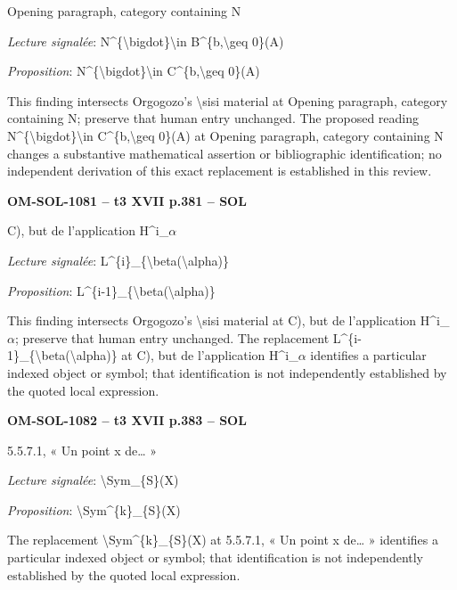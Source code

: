Opening paragraph, category containing N\par
\emph{Lecture signalée}: N\textasciicircum{}\{\textbackslash{}bigdot\}\textbackslash{}in B\textasciicircum{}\{b,\textbackslash{}geq 0\}(A)\par
\emph{Proposition}: N\textasciicircum{}\{\textbackslash{}bigdot\}\textbackslash{}in C\textasciicircum{}\{b,\textbackslash{}geq 0\}(A)\par
This finding intersects Orgogozo's \textbackslash{}sisi material at Opening paragraph, category containing N; preserve that human entry unchanged. The proposed reading N\textasciicircum{}\{\textbackslash{}bigdot\}\textbackslash{}in C\textasciicircum{}\{b,\textbackslash{}geq 0\}(A) at Opening paragraph, category containing N changes a substantive mathematical assertion or bibliographic identification; no independent derivation of this exact replacement is established in this review.\par
\par\noindent\textbf{OM-SOL-1081 -- t3 XVII p.381 -- SOL}\par
C), but de l'application H\textasciicircum{}i\_\ensuremath{\alpha}\par
\emph{Lecture signalée}: L\textasciicircum{}\{i\}\_\{\textbackslash{}beta(\textbackslash{}alpha)\}\par
\emph{Proposition}: L\textasciicircum{}\{i-1\}\_\{\textbackslash{}beta(\textbackslash{}alpha)\}\par
This finding intersects Orgogozo's \textbackslash{}sisi material at C), but de l'application H\textasciicircum{}i\_\ensuremath{\alpha}; preserve that human entry unchanged. The replacement L\textasciicircum{}\{i-1\}\_\{\textbackslash{}beta(\textbackslash{}alpha)\} at C), but de l'application H\textasciicircum{}i\_\ensuremath{\alpha} identifies a particular indexed object or symbol; that identification is not independently established by the quoted local expression.\par
\par\noindent\textbf{OM-SOL-1082 -- t3 XVII p.383 -- SOL}\par
5.5.7.1, « Un point x de… »\par
\emph{Lecture signalée}: \textbackslash{}Sym\_\{S\}(X)\par
\emph{Proposition}: \textbackslash{}Sym\textasciicircum{}\{k\}\_\{S\}(X)\par
The replacement \textbackslash{}Sym\textasciicircum{}\{k\}\_\{S\}(X) at 5.5.7.1, « Un point x de… » identifies a particular indexed object or symbol; that identification is not independently established by the quoted local expression.\par

